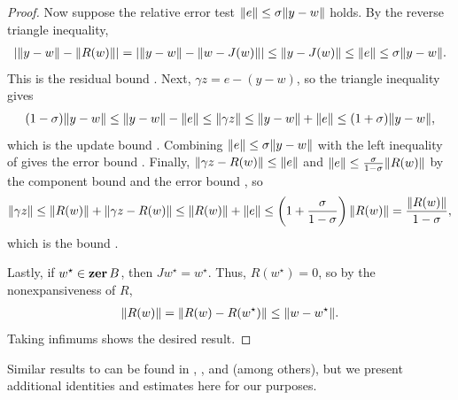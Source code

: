 \documentclass[11pt]{article}
\begin{document}
\begin{proof}
    Now suppose the relative error test $\lVert e\rVert\leq\sigma\lVert y-w\rVert$ holds.
    By the reverse triangle inequality,
    \begin{align}
        |\lVert y-w\rVert - \lVert R(w)\rVert| = |\lVert y-w\rVert - \lVert w - J(w)\rVert| \leq \lVert y-J(w)\rVert \leq \lVert e\rVert \leq \sigma\lVert y-w\rVert.
    \end{align}
    This is the residual bound .
    Next, $\gamma z = e - (y - w)$, so the triangle inequality gives
    \begin{align}
        (1-\sigma)\lVert y-w\rVert \leq \lVert y-w\rVert - \lVert e\rVert \leq \lVert\gamma z\rVert \leq \lVert y-w\rVert + \lVert e\rVert \leq (1+\sigma)\lVert y-w\rVert,
    \end{align}
    which is the update bound .
    Combining $\lVert e\rVert\leq\sigma\lVert y-w\rVert$ with the left inequality of  gives the error bound .
    Finally, $\lVert\gamma z - R(w)\rVert \leq \lVert e\rVert$ and $\lVert e\rVert \leq \frac{\sigma}{1-\sigma}\lVert R(w)\rVert$ by the component bound  and the error bound , so
    \begin{align}
        \lVert\gamma z\rVert \leq \lVert R(w)\rVert + \lVert\gamma z - R(w)\rVert \leq \lVert R(w)\rVert + \lVert e\rVert \leq \left(1 + \frac{\sigma}{1-\sigma}\right)\lVert R(w)\rVert = \frac{\lVert R(w)\rVert}{1-\sigma},
    \end{align}
    which is the bound .

    Lastly, if $w^\star\in\mathop{\bf zer} {B}$, then $J w^\star = w^\star$.
    Thus, $R(w^\star) = 0$, so by the nonexpansiveness of $R$,
    \begin{align}
        \lVert R(w)\rVert = \lVert R(w) - R(w^\star)\rVert \leq \lVert w-w^\star\rVert.
    \end{align}
    Taking infimums shows the desired result.
\end{proof}
Similar results to  can be found in \citet[Propositions 1, 2, and 3]{rockafellar1976monotoneoperatorsandppm}, \citet[Lemma 2.6]{bredies2021degeneratepreconditionedproximalpoint}, and \citet[Proposition 2.3]{alves2025generalframeworkinexactsplitting} (among others), but we present additional identities and estimates here for our purposes.
\end{document}
